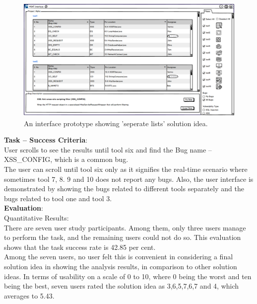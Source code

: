\begin{figure}[hbt!]
	\centering
	\includegraphics[width=\linewidth]{figures/solution_ideas_snaps/S21_seperate_lists}
	\caption{An interface prototype showing 'seperate lists' solution idea.}
	\label{fig:S21_seperate_lists}
\end{figure}

\textbf{Task – Success Criteria}: \\

User scrolls to see the results until tool six and find the Bug name – XSS\_CONFIG, which is a common bug. \\

The user can scroll until tool six only as it signifies the real-time scenario where sometimes tool 7, 8. 9 and 10 does not report any bugs. Also, the user interface is demonstrated by showing the bugs related to different tools separately and the bugs related to tool one and tool 3. \\
\clearpage
\textbf{Evaluation}: \\

Quantitative Results: \\

There are seven user study participants. Among them, only three users manage to perform the task, and the remaining users could not do so. This evaluation shows that the task success rate is 42.85 per cent. \\

Among the seven users, no user felt this is convenient in considering a final solution idea in showing the analysis results, in comparison to other solution ideas. In terms of usability on a scale of 0 to 10, where 0 being the worst and ten being the best, seven users rated the solution idea as 3,6,5,7,6,7 and 4, which averages to 5.43. \\

